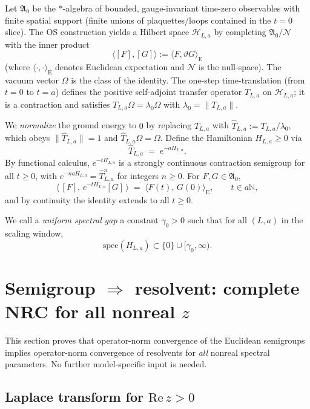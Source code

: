 \documentclass[11pt]{article}
\begin{document}
Let $\mathfrak{A}_0$ be the $*$-algebra of bounded, gauge-invariant time-zero observables with finite spatial support (finite unions of plaquettes/loops contained in the $t=0$ slice). The OS construction yields a Hilbert space $\mathcal{H}_{L,a}$ by completing $\mathfrak{A}_0/\mathcal{N}$ with the inner product
\[
\langle [F],[G]\rangle := \langle F,\vartheta G\rangle_{\mathrm{E}}
\]
(where $\langle\cdot,\cdot\rangle_{\mathrm{E}}$ denotes Euclidean expectation and $\mathcal{N}$ is the null-space). The vacuum vector $\Omega$ is the class of the identity. The one-step time-translation (from $t=0$ to $t=a$) defines the positive self-adjoint transfer operator $T_{L,a}$ on $\mathcal{H}_{L,a}$; it is a contraction and satisfies $T_{L,a}\Omega=\lambda_0\Omega$ with $\lambda_0=\|T_{L,a}\|$.

We \emph{normalize} the ground energy to $0$ by replacing $T_{L,a}$ with $\widehat{T}_{L,a}:=T_{L,a}/\lambda_0$, which obeys $\|\widehat{T}_{L,a}\|=1$ and $\widehat{T}_{L,a}\Omega=\Omega$. Define the Hamiltonian $H_{L,a}\ge 0$ via
\[
\widehat{T}_{L,a} \;=\; e^{-a H_{L,a}}.
\]
By functional calculus, $e^{-tH_{L,a}}$ is a strongly continuous contraction semigroup for all $t\ge 0$, with $e^{-naH_{L,a}}=\widehat{T}_{L,a}^n$ for integers $n\ge 0$. For $F,G\in\mathfrak{A}_0$,
\begin{equation}\label{OSsemigroup}
\langle \, [F],\, e^{-tH_{L,a}} [G] \,\rangle \;=\; \langle F(t),\, G(0)\rangle_{\mathrm{E}},\qquad t\in a\mathbb{N},
\end{equation}
and by continuity the identity extends to all $t\ge 0$.

We call a \emph{uniform spectral gap} a constant $\gamma_0>0$ such that for all $(L,a)$ in the scaling window,
\begin{equation}\label{uniformgap}
\mathrm{spec}(H_{L,a})\subset\{0\}\cup[\gamma_0,\infty).
\end{equation}

\section{Semigroup $\Rightarrow$ resolvent: complete NRC for all nonreal $z$}

This section proves that operator-norm convergence of the Euclidean semigroups implies operator-norm convergence of resolvents for \emph{all} nonreal spectral parameters. No further model-specific input is needed.

\subsection{Laplace transform for $\mathrm{Re}\,z>0$}
\end{document}
